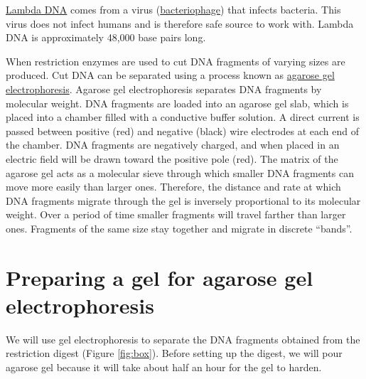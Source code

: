 \href{https://en.wikipedia.org/wiki/Lambda_phage}{Lambda DNA} comes from a virus (\href{https://en.wikipedia.org/wiki/Bacteriophage}{bacteriophage}) that infects bacteria. This virus does not infect humans and is therefore safe source to work with. Lambda DNA is approximately 48,000 base pairs long.

When restriction enzymes are used to cut DNA fragments of varying sizes are produced. Cut DNA can be separated using a process known as \href{https://en.wikipedia.org/wiki/Agarose_gel_electrophoresis}{agarose gel electrophoresis}.
Agarose gel electrophoresis separates DNA fragments by molecular weight. DNA fragments are loaded into an agarose gel slab, which is placed into a chamber filled with a conductive buffer solution. A direct current is passed between positive (red) and negative (black) wire electrodes at each end of the chamber. DNA fragments are negatively charged, and when placed in an electric field will be drawn toward the positive pole (red). The matrix of the agarose gel acts as a molecular sieve through which smaller DNA fragments can move more easily than larger ones. Therefore, the distance and rate at which DNA fragments migrate through the gel is inversely proportional to its molecular weight. Over a period of time smaller fragments will travel farther than larger ones. Fragments of the same size stay together and migrate in discrete ``bands''.

\section{Preparing a gel for agarose gel electrophoresis}\label{preparing-a-gel-for-agarose-gel-electrophoresis}

We will use gel electrophoresis to separate the DNA fragments obtained from the restriction digest (Figure \ref{fig:box}). Before setting up the digest, we will pour agarose gel because it will take about half an hour for the gel to harden.

